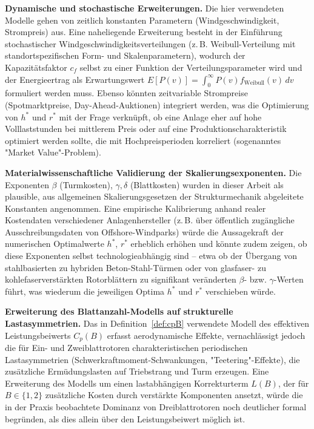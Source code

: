 ﻿\documentclass[a4paper,12pt]{article}
\theoremstyle{definition}
\begin{document}
\textbf{Dynamische und stochastische Erweiterungen.} Die hier verwendeten Modelle gehen von zeitlich konstanten Parametern (Windgeschwindigkeit, Strompreis) aus. Eine naheliegende Erweiterung besteht in der Einführung stochastischer Windgeschwindigkeitsverteilungen (z.\,B. Weibull-Verteilung mit standortspezifischen Form- und Skalenparametern), wodurch der Kapazitätsfaktor $c_f$ selbst zu einer Funktion der Verteilungsparameter wird und der Energieertrag als Erwartungswert $E[P(v)] = \int_0^\infty P(v) f_{\mathrm{Weibull}}(v)\,dv$ formuliert werden muss. Ebenso könnten zeitvariable Strompreise (Spotmarktpreise, Day-Ahead-Auktionen) integriert werden, was die Optimierung von $h^*$ und $r^*$ mit der Frage verknüpft, ob eine Anlage eher auf hohe Volllaststunden bei mittlerem Preis oder auf eine Produktionscharakteristik optimiert werden sollte, die mit Hochpreisperioden korreliert (sogenanntes "Market Value"-Problem).

\textbf{Materialwissenschaftliche Validierung der Skalierungsexponenten.} Die Exponenten $\beta$ (Turmkosten), $\gamma,\delta$ (Blattkosten) wurden in dieser Arbeit als plausible, aus allgemeinen Skalierungsgesetzen der Strukturmechanik abgeleitete Konstanten angenommen. Eine empirische Kalibrierung anhand realer Kostendaten verschiedener Anlagenhersteller (z.\,B. über öffentlich zugängliche Ausschreibungsdaten von Offshore-Windparks) würde die Aussagekraft der numerischen Optimalwerte $h^*$, $r^*$ erheblich erhöhen und könnte zudem zeigen, ob diese Exponenten selbst technologieabhängig sind -- etwa ob der Übergang von stahlbasierten zu hybriden Beton-Stahl-Türmen oder von glasfaser- zu kohlefaserverstärkten Rotorblättern zu signifikant veränderten $\beta$- bzw. $\gamma$-Werten führt, was wiederum die jeweiligen Optima $h^*$ und $r^*$ verschieben würde.

\textbf{Erweiterung des Blattanzahl-Modells auf strukturelle Lastasymmetrien.} Das in Definition~\ref{def:cpB} verwendete Modell des effektiven Leistungsbeiwerts $C_p(B)$ erfasst aerodynamische Effekte, vernachlässigt jedoch die für Ein- und Zweiblattrotoren charakteristischen periodischen Lastasymmetrien (Schwerkraftmoment-Schwankungen, "Teetering"-Effekte), die zusätzliche Ermüdungslasten auf Triebstrang und Turm erzeugen. Eine Erweiterung des Modells um einen lastabhängigen Korrekturterm $L(B)$, der für $B\in\{1,2\}$ zusätzliche Kosten durch verstärkte Komponenten ansetzt, würde die in der Praxis beobachtete Dominanz von Dreiblattrotoren noch deutlicher formal begründen, als dies allein über den Leistungsbeiwert möglich ist.
\end{document}
